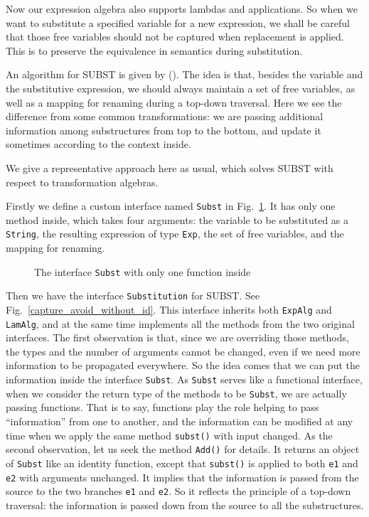 Now our expression algebra also supports lambdas and applications. So when we want to substitute a specified variable for a new expression, we shall be careful that those free variables should not be captured when replacement is applied. This is to preserve the equivalence in semantics during substitution.

An algorithm for SUBST is given by (). The idea is that, besides the variable and the substitutive expression, we should always maintain a set of free variables, as well as a mapping for renaming during a top-down traversal. Here we see the difference from some common transformations: we are passing additional information among substructures from top to the bottom, and update it sometimes according to the context inside.

We give a representative approach here as usual, which solves SUBST with respect to transformation algebras.

Firstly we define a custom interface named \lstinline{Subst} in Fig.~\ref{interface_subst}. It has only one method inside, which takes four arguments: the variable to be substituted as a \lstinline{String}, the resulting expression of type \lstinline{Exp}, the set of free variables, and the mapping for renaming.

\begin{figure}[!htbp]
\vspace{-.1in}
\caption{The interface \lstinline{Subst} with only one function inside}
\label{interface_subst}
\end{figure}

Then we have the interface \lstinline{Substitution} for SUBST. See Fig.~\ref{capture_avoid_without_id}. This interface inherits both \lstinline{ExpAlg} and \lstinline{LamAlg}, and at the same time implements all the methods from the two original interfaces. The first observation is that, since we are overriding those methods, the types and the number of arguments cannot be changed, even if we need more information to be propagated everywhere. So the idea comes that we can put the information inside the interface \lstinline{Subst}. As \lstinline{Subst} serves like a functional interface, when we consider the return type of the methods to be \lstinline{Subst}, we are actually passing functions. That is to say, functions play the role helping to pass ``information'' from one to another, and the information can be modified at any time when we apply the same method \lstinline{subst()} with input changed. As the second observation, let us seek the method \lstinline{Add()} for details. It returns an object of \lstinline{Subst} like an identity function, except that \lstinline{subst()} is applied to both \lstinline{e1} and \lstinline{e2} with arguments unchanged. It implies that the information is passed from the source to the two branches \lstinline{e1} and \lstinline{e2}. So it reflects the principle of a top-down traversal: the information is passed down from the source to all the substructures.

